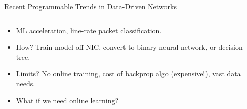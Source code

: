 \documentclass[aspectratio=169,xcolor={dvipsnames}
,handout
]{beamer}
\begin{document}
\begin{frame}{Recent Programmable Trends in Data-Driven Networks}
	\begin{columns}
		\begin{column}{0.6\linewidth}
			\begin{itemize}
				\item ML acceleration, line-rate packet classification.
				\item How? Train model off-NIC, convert to \alert{binary neural network}\footnotemark, or \alert{decision tree}\footnotemark.
				\item Limits? No online training, cost of backprop algo (expensive!), vast data needs.
				\item \alert{What if we need online learning?}
			\end{itemize}
		\end{column}
		\begin{column}{0.4\linewidth}
			\centering
		

\end{column}
\end{columns}
\end{frame}
\end{document}
